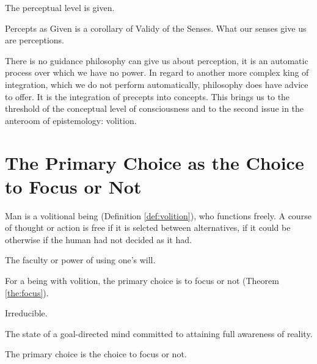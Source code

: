             \begin{corollary}
            \label{cor:percepts}
                The perceptual level is given.
            \end{corollary}

            \begin{remark}
                Percepts as Given is a corollary of Validy of the Senses. What our senses give us are perceptions.
            \end{remark}
    
        There is no guidance philosophy can give us about perception, it is an automatic process over which we have no power. In regard to another more complex king of integration, which we do not perform automatically, philosophy does have advice to offer. It is the integration of precepts into concepts. This brings us to the threshold of the conceptual level of consciousness and to the second issue in the anteroom of epistemology: volition.

    \section{The Primary Choice as the Choice to Focus or Not}

        Man is a volitional being (Definition \ref{def:volition}), who functions freely. A course of thought or action is free if it is selcted between alternatives, if it could be otherwise if the human had not decided as it had.

            \begin{definition}[Volition]
            \label{def:volition}
                The faculty or power of using one's will.
            \end{definition}

        For a being with volition, the primary choice is to focus or not (Theorem \ref{the:focus}).

            \begin{definition}[Primary]
            \label{def:primary}
                Irreducible.
            \end{definition}

            \begin{definition}[Focus]
            \label{def:focus}
                The state of a goal-directed mind committed to attaining full awareness of reality.
            \end{definition}

            \begin{theorem}
            \label{the:focus}
                The primary choice is the choice to focus or not.
            \end{theorem}

